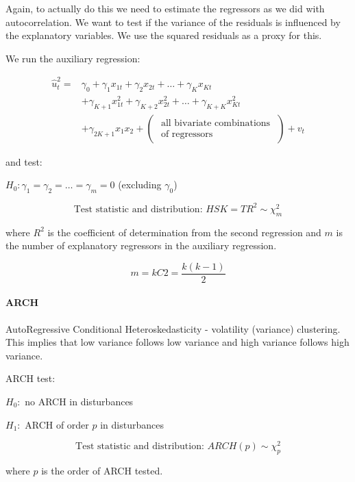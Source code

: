 \documentclass[11pt]{article}
\begin{document}
Again, to actually do this we need to estimate the regressors as we did with autocorrelation. We want to test if the variance of the residuals is influenced by the explanatory variables. We use the squared residuals as a proxy for this.

We run the auxiliary regression:

\begin{equation}
\begin{aligned}
\hat{u}_t^2= & \gamma_0+\gamma_1 x_{1 t}+\gamma_2 x_{2 t}+\ldots+\gamma_K x_{K t} \\
& +\gamma_{K+1} x_{1 t}^2+\gamma_{K+2} x_{2 t}^2+\ldots+\gamma_{K+K} x_{K t}^2 \\
& +\gamma_{2 K+1} x_1 x_2+\left(\begin{array}{c}
\text { all bivariate combinations } \\
\text { of regressors }
\end{array}\right)+v_t
\end{aligned}
\end{equation}

and test:

$H_0: \gamma_1 = \gamma_2 = \ldots = \gamma_m = 0$ (excluding $\gamma_0$)

\[\text{Test statistic and distribution: } HSK = TR^2 \sim \chi_m^2\]

where $R^2$ is the coefficient of determination from the second regression and $m$ is the number of explanatory regressors in the auxiliary regression.

\[m = kC2 = \dfrac{k(k-1)}{2}\]

\paragraph{ARCH} \mbox{}

AutoRegressive Conditional Heteroskedasticity - volatility (variance) clustering. This implies that low variance follows low variance and high variance follows high variance.

\begin{mdframed}
    ARCH test:

    $H_0:$ no ARCH in disturbances

    $H_1:$ ARCH of order $p$ in disturbances

    \[\text{Test statistic and distribution: } ARCH(p) \sim \chi_p^2\]

    where $p$ is the order of ARCH tested.
\end{mdframed}
\end{document}
